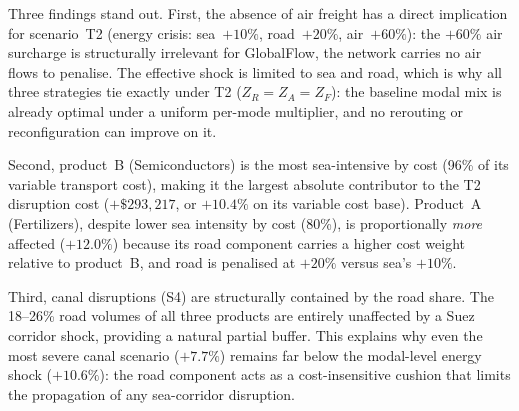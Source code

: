 Three findings stand out. First, the absence of air freight has
a direct implication for scenario~T2 (energy crisis: sea~$+10\%$,
road~$+20\%$, air~$+60\%$): the $+60\%$ air surcharge is
structurally irrelevant for GlobalFlow, the network
carries no air flows to penalise. The effective shock is limited
to sea and road, which is why all three strategies tie exactly
under T2 ($Z_R = Z_A = Z_F$): the baseline modal mix is already
optimal under a uniform per-mode multiplier, and no rerouting or
reconfiguration can improve on it.
 
Second, product~B (Semiconductors) is the most
sea-intensive by cost (96\% of its variable transport cost),
making it the largest absolute contributor to the T2 disruption
cost ($+\$293{,}217$, or $+10.4\%$ on its variable cost base).
Product~A (Fertilizers), despite lower sea intensity by cost
(80\%), is proportionally \textit{more} affected ($+12.0\%$)
because its road component carries a higher cost weight relative
to product~B, and road is penalised at $+20\%$ versus sea's
$+10\%$.
 
Third, canal disruptions (S4) are structurally
contained by the road share. The 18--26\% road volumes of all
three products are entirely unaffected by a Suez corridor shock,
providing a natural partial buffer. This explains why even the
most severe canal scenario ($+7.7\%$) remains far below the
modal-level energy shock ($+10.6\%$): the road component acts
as a cost-insensitive cushion that limits the propagation of any
sea-corridor disruption.